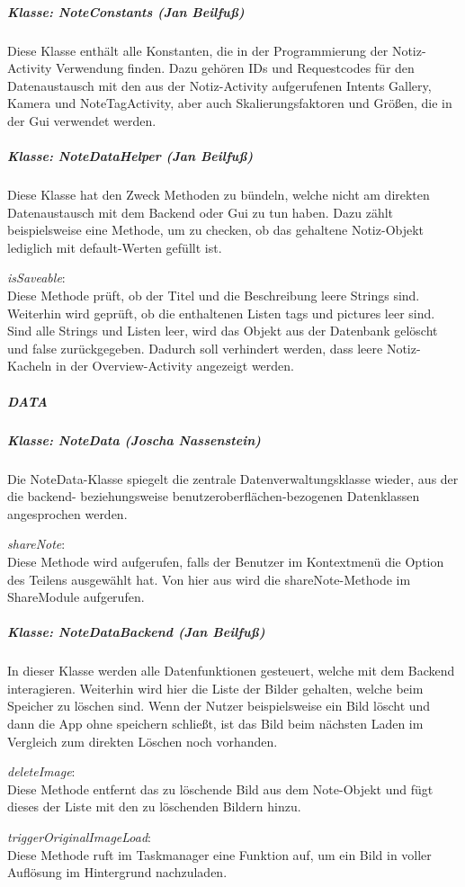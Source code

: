 \subparagraph{Klasse: NoteConstants (Jan Beilfuß)}
Diese Klasse enthält alle Konstanten, die in der Programmierung der Notiz-Activity Verwendung finden. Dazu gehören IDs und Requestcodes für den Datenaustausch mit den aus der Notiz-Activity aufgerufenen Intents Gallery, Kamera und NoteTagActivity, aber auch Skalierungsfaktoren und Größen, die in der Gui verwendet werden.

\subparagraph{Klasse: NoteDataHelper (Jan Beilfuß)}
Diese Klasse hat den Zweck Methoden zu bündeln, welche nicht am direkten Datenaustausch mit dem Backend oder Gui zu tun haben. Dazu zählt beispielsweise eine Methode, um zu checken, ob das gehaltene Notiz-Objekt lediglich mit default-Werten gefüllt ist.

\textit{isSaveable}:\\
 Diese Methode prüft, ob der Titel und die Beschreibung leere Strings sind. Weiterhin wird geprüft, ob die enthaltenen Listen tags und pictures leer sind. Sind alle Strings und Listen leer, wird das Objekt aus der Datenbank gelöscht und false zurückgegeben. Dadurch soll verhindert werden, dass leere Notiz-Kacheln in der Overview-Activity angezeigt werden.

\subparagraph{DATA}
\subparagraph*{Klasse: NoteData (Joscha Nassenstein)}
Die NoteData-Klasse spiegelt die zentrale Datenverwaltungsklasse wieder, aus der die backend- beziehungsweise benutzeroberflächen-bezogenen Datenklassen angesprochen werden.

\textit{shareNote}:\\
Diese Methode wird aufgerufen, falls der Benutzer im Kontextmenü die Option des Teilens ausgewählt hat. Von hier aus wird die shareNote-Methode im ShareModule aufgerufen.

\subparagraph*{Klasse: NoteDataBackend (Jan Beilfuß)}
In dieser Klasse werden alle Datenfunktionen gesteuert, welche mit dem Backend interagieren. Weiterhin wird hier die Liste der Bilder gehalten, welche beim Speicher zu löschen sind. Wenn der Nutzer beispielsweise ein Bild löscht und dann die App ohne speichern schließt, ist das Bild beim nächsten Laden im Vergleich zum direkten Löschen noch vorhanden.

\textit{deleteImage}:\\
Diese Methode entfernt das zu löschende Bild aus dem Note-Objekt und fügt dieses der Liste mit den zu löschenden Bildern hinzu.

\textit{triggerOriginalImageLoad}:\\
Diese Methode ruft im Taskmanager eine Funktion auf, um ein Bild in voller Auflösung im Hintergrund nachzuladen.

